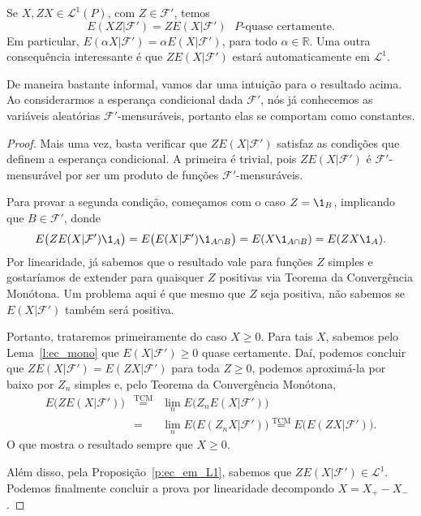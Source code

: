 \begin{proposition}
  \label{p:EZX_ZEX}
  Se $X, ZX \in \mathcal{L}^1(P)$, com $Z \in \mathcal{F}'$, temos
  \begin{equation}
    E(XZ|\mathcal{F}') = Z E(X|\mathcal{F}') \text{ $P$-quase certamente}.
  \end{equation}
  Em particular, $E(\alpha X|\mathcal{F}') = \alpha E(X|\mathcal{F}')$, para todo $\alpha \in \mathbb{R}$.
  Uma outra consequência interessante é que $Z E(X|\mathcal{F}')$ estará automaticamente em $\mathcal{L}^1$.
\end{proposition}

De maneira bastante informal, vamos dar uma intuição para o resultado acima.
Ao considerarmos a esperança condicional dada $\mathcal{F}'$, nós já conhecemos as variáveis aleatórias $\mathcal{F}'$-mensuráveis, portanto elas se comportam como constantes.

\begin{proof}
  Mais uma vez, basta verificar que $Z E(X|\mathcal{F}')$ satisfaz as condições que definem a esperança condicional.
  A primeira é trivial, pois $Z E(X|\mathcal{F}')$ é $\mathcal{F}'$-mensurável por ser um produto de funções $\mathcal{F}'$-mensuráveis.

  Para provar a segunda condição, começamos com o caso $Z = \1_B$, implicando que $B \in \mathcal{F}'$, donde
  \begin{equation*}
    E\big(ZE(X|\mathcal{F}') \1_A \big) = E\big( E(X|\mathcal{F}') \1_{A \cap B}\big) = E(X \1_{A \cap B}) = E(ZX \1_A).
  \end{equation*}
  Por linearidade, já sabemos que o resultado vale para funções $Z$ simples e gostaríamos de extender para quaisquer $Z$ positivas via Teorema da Convergência Monótona.
  Um problema aqui é que mesmo que $Z$ seja positiva, não sabemos se $E(X|\mathcal{F}')$ também será positiva.

  Portanto, trataremos primeiramente do caso $X \geq 0$.
  Para tais $X$, sabemos pelo Lema~\ref{l:ec_mono} que $E(X|\mathcal{F}') \geq 0$ quase certamente.
  Daí, podemos concluir que $Z E(X|\mathcal{F}') = E(ZX|\mathcal{F}')$ para toda $Z \geq 0$, podemos aproximá-la por baixo por $Z_n$ simples e, pelo Teorema da Convergência Monótona,
  \begin{equation}
    \begin{array}{e}
      E\big( Z E(X|\mathcal{F}') \big) & \overset{\text{TCM}}= & \lim_n E\big( Z_n E(X|\mathcal{F}') \big)\\
      & = & \lim_n E\big( E(Z_n X|\mathcal{F}') \big) \overset{\text{TCM}}= E\big( E(ZX|\mathcal{F}') \big).
    \end{array}
  \end{equation}
  O que mostra o resultado sempre que $X \geq 0$.

  Além disso, pela Proposição~\ref{p:ec_em_L1}, sabemos que $Z E(X|\mathcal{F}') \in \mathcal{L}^1$.
  Podemos finalmente concluir a prova por linearidade decompondo $X = X_+ - X_-$.
\end{proof}

